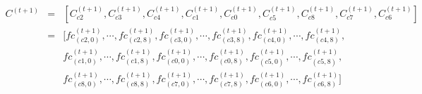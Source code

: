 \documentclass[12pt,a4paper]{article}
\begin{document}
\begin{equation*}
\begin{aligned}
C^{(t+1)} & = & [C_{c2}^{(t+1)}, C_{c3}^{(t+1)}, C_{c4}^{(t+1)}, C_{c1}^{(t+1)}, C_{c0}^{(t+1)}, C_{c5}^{(t+1)}, C_{c8}^{(t+1)}, C_{c7}^{(t+1)}, C_{c6}^{(t+1)}]  \\
  & = & [fc_{(c2,0)}^{(t+1)}, \cdots, fc_{(c2, 8)}^{(t+1)}, fc_{(c3, 0)}^{(t+1)}, \cdots, fc_{(c3, 8)}^{(t+1)}, fc_{(c4,0)}^{(t+1)}, \cdots, fc_{(c4, 8)}^{(t+1)}, \\
  &   & fc_{(c1,0)}^{(t+1)}, \cdots, fc_{(c1, 8)}^{(t+1)},fc_{(c0,0)}^{(t+1)}, \cdots,　fc_{(c0,8)}^{(t+1)},　fc_{(c5,0)}^{(t+1)},　\cdots, fc_{(c5,8)}^{(t+1)}, \\
  &   & fc_{(c8,0)}^{(t+1)}, \cdots, fc_{(c8, 8)}^{(t+1)}, fc_{(c7, 0)}^{(t+1)}, \cdots, fc_{(c7,8)}^{(t+1)}, fc_{(c6,0)}^{(t+1)}, \cdots, fc_{(c6,8)}^{(t+1)}]
\end{aligned}
\end{equation*}
\ifx\allfiles\undefined
\end{document}
